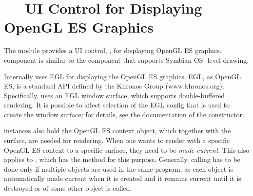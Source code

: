 %
%
%

\section{ ---
  UI Control for Displaying OpenGL ES Graphics}
\label{sec:glcanvas}


The  module provides a UI control, , for
displaying OpenGL ES graphics.  component is similar to the
  component that supports Symbian OS -level
drawing.

Internally  uses EGL for displaying the OpenGL ES graphics. EGL,
as OpenGL ES, is a standard API defined by the Khronos Group
(www.khronos.org). Specifically,  uses an EGL window surface,
which supports double-buffered rendering. It is possible to affect selection of
the EGL config that is used to create the window surface; for details, see the
documentation of the  constructor.

 instances also hold the OpenGL ES context object, which
together with the surface, are needed for rendering. When one wants to render
with a specific OpenGL ES context to a specific surface, they need to be
\emph{made current}. This also applies to , which has the
 method for this purpose. Generally, calling
 has to be done only if multiple  objects are
used in the same program, as each  object is automatically made
current when it is created and it remains current until it is destroyed or
 of some other  object is called.


